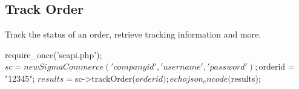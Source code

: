 \subsection*{Track Order}

Track the status of an order, retrieve tracking information and more. \begin{DoxyVerb}require_once('scapi.php');
$sc = new SigmaCommerce('companyid', 'username', 'password');

$orderid = "12345";
$results = $sc->trackOrder($orderid);
echo json_encode($results);\end{DoxyVerb}
 